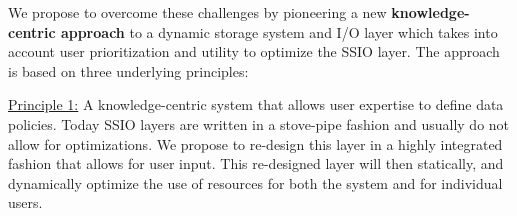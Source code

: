 
%
%
%

We propose to overcome these challenges by pioneering a new {\bf knowledge-centric approach} to a dynamic storage system
and I/O layer which takes into account user prioritization and utility to optimize the SSIO layer. The approach is based on 
three underlying principles:

\underline{Principle 1:} A knowledge-centric system that allows user expertise to define data policies. Today SSIO
layers are written in a stove-pipe fashion and usually do not allow for optimizations. We propose to re-design this
layer in a highly integrated fashion that allows for user input. This re-designed layer will then statically, and dynamically optimize the use of resources for both the system and for individual users.

